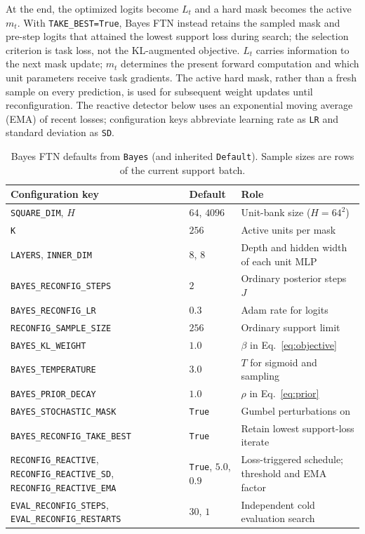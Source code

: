 \documentclass[11pt]{article}
\begin{document}
At the end, the optimized logits become $L_t$ and a hard mask becomes the
active $m_t$.
With \texttt{TAKE\_BEST=True}, Bayes FTN instead retains the sampled mask
and pre-step logits that attained the lowest support loss during search;
the selection criterion is task loss, not the KL-augmented objective.
$L_t$ carries information to the next mask update; $m_t$ determines the
present forward computation and which unit parameters receive task gradients.
The active hard mask, rather than a fresh sample on every prediction, is used
for subsequent weight updates until reconfiguration. The reactive detector
below uses an exponential moving average (EMA) of recent losses; configuration
keys abbreviate learning rate as \texttt{LR} and standard deviation as
\texttt{SD}.

\begin{table}[H]
\centering\small
\caption{Bayes FTN defaults from \texttt{Bayes} (and inherited \texttt{Default}).
Sample sizes are rows of the current support batch.}
\begin{tabular}{@{}p{.40\linewidth}p{.17\linewidth}p{.34\linewidth}@{}}
\toprule
Configuration key & Default & Role \\
\midrule
\texttt{SQUARE\_DIM}, $H$ & $64$, $4096$ & Unit-bank size ($H=64^2$) \\
\texttt{K} & $256$ & Active units per mask \\
\texttt{LAYERS}, \texttt{INNER\_DIM} & $8$, $8$ & Depth and hidden width of each unit MLP \\
\texttt{BAYES\_RECONFIG\_STEPS} & $2$ & Ordinary posterior steps $J$ \\
\texttt{BAYES\_RECONFIG\_LR} & $0.3$ & Adam rate for logits \\
\texttt{RECONFIG\_SAMPLE\_SIZE} & $256$ & Ordinary support limit \\
\texttt{BAYES\_KL\_WEIGHT} & $1.0$ & $\beta$ in Eq.~\eqref{eq:objective} \\
\texttt{BAYES\_TEMPERATURE} & $3.0$ & $T$ for sigmoid and sampling \\
\texttt{BAYES\_PRIOR\_DECAY} & $1.0$ & $\rho$ in Eq.~\eqref{eq:prior} \\
\texttt{BAYES\_STOCHASTIC\_MASK} & \texttt{True} & Gumbel perturbations on \\
\texttt{BAYES\_RECONFIG\_TAKE\_BEST} & \texttt{True} & Retain lowest support-loss iterate \\
\texttt{RECONFIG\_REACTIVE}, \texttt{RECONFIG\_REACTIVE\_SD}, \texttt{RECONFIG\_REACTIVE\_EMA} & \texttt{True}, $5.0$, $0.9$ & Loss-triggered schedule; threshold and EMA factor \\
\texttt{EVAL\_RECONFIG\_STEPS}, \texttt{EVAL\_RECONFIG\_RESTARTS} & $30$, $1$ & Independent cold evaluation search \\
\bottomrule
\end{tabular}
\end{table}
\end{document}
